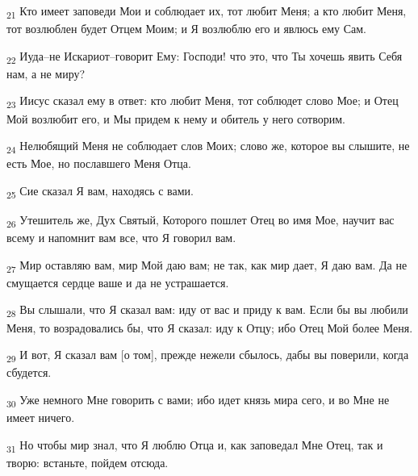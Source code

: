\begin{tcolorbox}
\textsubscript{21} Кто имеет заповеди Мои и соблюдает их, тот любит Меня; а кто любит Меня, тот возлюблен будет Отцем Моим; и Я возлюблю его и явлюсь ему Сам.
\end{tcolorbox}
\begin{tcolorbox}
\textsubscript{22} Иуда--не Искариот--говорит Ему: Господи! что это, что Ты хочешь явить Себя нам, а не миру?
\end{tcolorbox}
\begin{tcolorbox}
\textsubscript{23} Иисус сказал ему в ответ: кто любит Меня, тот соблюдет слово Мое; и Отец Мой возлюбит его, и Мы придем к нему и обитель у него сотворим.
\end{tcolorbox}
\begin{tcolorbox}
\textsubscript{24} Нелюбящий Меня не соблюдает слов Моих; слово же, которое вы слышите, не есть Мое, но пославшего Меня Отца.
\end{tcolorbox}
\begin{tcolorbox}
\textsubscript{25} Сие сказал Я вам, находясь с вами.
\end{tcolorbox}
\begin{tcolorbox}
\textsubscript{26} Утешитель же, Дух Святый, Которого пошлет Отец во имя Мое, научит вас всему и напомнит вам все, что Я говорил вам.
\end{tcolorbox}
\begin{tcolorbox}
\textsubscript{27} Мир оставляю вам, мир Мой даю вам; не так, как мир дает, Я даю вам. Да не смущается сердце ваше и да не устрашается.
\end{tcolorbox}
\begin{tcolorbox}
\textsubscript{28} Вы слышали, что Я сказал вам: иду от вас и приду к вам. Если бы вы любили Меня, то возрадовались бы, что Я сказал: иду к Отцу; ибо Отец Мой более Меня.
\end{tcolorbox}
\begin{tcolorbox}
\textsubscript{29} И вот, Я сказал вам [о том], прежде нежели сбылось, дабы вы поверили, когда сбудется.
\end{tcolorbox}
\begin{tcolorbox}
\textsubscript{30} Уже немного Мне говорить с вами; ибо идет князь мира сего, и во Мне не имеет ничего.
\end{tcolorbox}
\begin{tcolorbox}
\textsubscript{31} Но чтобы мир знал, что Я люблю Отца и, как заповедал Мне Отец, так и творю: встаньте, пойдем отсюда.
\end{tcolorbox}
